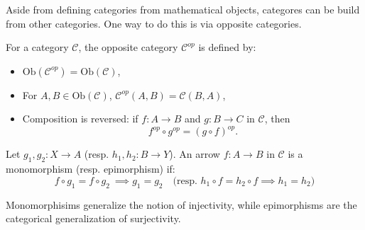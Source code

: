 Aside from defining categories from mathematical objects, categores can be build from other categories. One way to do this is via opposite categories.

\begin{definition} For a category $\mathcal{C}$, the opposite category $\mathcal{C}^{op}$ is defined by:
\begin{itemize}
    \item $\mathrm{Ob}(\mathcal{C}^{op}) = \mathrm{Ob}(\mathcal{C})$,
    \item For $A,B \in \mathrm{Ob}(\mathcal{C})$, $\mathcal{C}^{op}(A,B) = \mathcal{C}(B,A)$,
    \item Composition is reversed: if $f : A \to B$ and $g : B \to C$ in $\mathcal{C}$, then
    \[
    f^{op} \circ g^{op} = (g \circ f)^{op}.
    \]
\end{itemize}
\end{definition}






\begin{definition}
  \label{def:monos-epis} Let \( g_1, g_2 : X \to A \) (resp. \( h_1, h_2 : B \to Y \)). An arrow \( f : A \to B \) in \( \mathcal{C} \) is a monomorphism (resp. epimorphism) if:
\[
  f \circ g_1 = f \circ g_2 \ \implies g_1 = g_2 \quad \text{(resp. } h_1 \circ f = h_2 \circ f \implies h_1 = h_2 \text{)}
\]

\end{definition}

\begin{note}
  Monomorphisims generalize the notion of injectivity, while epimorphisms are the categorical generalization of surjectivity.
\end{note}



